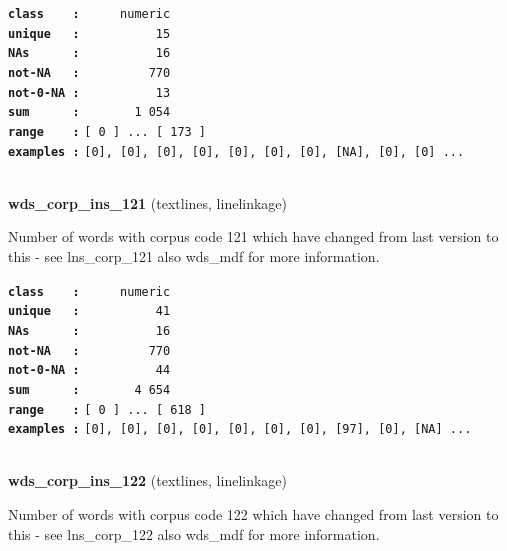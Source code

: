 \documentclass[]{article}
\begin{document}
\textbf{\texttt{class\ \ \ \ :}} \texttt{~~~~~numeric}\\
\textbf{\texttt{unique\ \ \ :}} \texttt{~~~~~~~~~~15}\\
\textbf{\texttt{NAs\ \ \ \ \ \ :}} \texttt{~~~~~~~~~~16}\\
\textbf{\texttt{not-NA\ \ \ :}} \texttt{~~~~~~~~~770}\\
\textbf{\texttt{not-0-NA\ :}} \texttt{~~~~~~~~~~13}\\
\textbf{\texttt{sum\ \ \ \ \ \ :}} \texttt{~~~~~~~1~054}\\
\textbf{\texttt{range\ \ \ \ :}}
\texttt{{[}\ 0\ {]}\ ...\ {[}\ 173\ {]}}\\
\textbf{\texttt{examples\ :}}
\texttt{{[}0{]},\ {[}0{]},\ {[}0{]},\ {[}0{]},\ {[}0{]},\ {[}0{]},\ {[}0{]},\ {[}NA{]},\ {[}0{]},\ {[}0{]}\ ...}\\

~

\textbf{wds\_corp\_ins\_121} (textlines, linelinkage)

Number of words with corpus code 121 which have changed from last
version to this - see lns\_corp\_121 also wds\_mdf for more information.

\textbf{\texttt{class\ \ \ \ :}} \texttt{~~~~~numeric}\\
\textbf{\texttt{unique\ \ \ :}} \texttt{~~~~~~~~~~41}\\
\textbf{\texttt{NAs\ \ \ \ \ \ :}} \texttt{~~~~~~~~~~16}\\
\textbf{\texttt{not-NA\ \ \ :}} \texttt{~~~~~~~~~770}\\
\textbf{\texttt{not-0-NA\ :}} \texttt{~~~~~~~~~~44}\\
\textbf{\texttt{sum\ \ \ \ \ \ :}} \texttt{~~~~~~~4~654}\\
\textbf{\texttt{range\ \ \ \ :}}
\texttt{{[}\ 0\ {]}\ ...\ {[}\ 618\ {]}}\\
\textbf{\texttt{examples\ :}}
\texttt{{[}0{]},\ {[}0{]},\ {[}0{]},\ {[}0{]},\ {[}0{]},\ {[}0{]},\ {[}0{]},\ {[}97{]},\ {[}0{]},\ {[}NA{]}\ ...}\\

~

\textbf{wds\_corp\_ins\_122} (textlines, linelinkage)

Number of words with corpus code 122 which have changed from last
version to this - see lns\_corp\_122 also wds\_mdf for more information.
\end{document}
